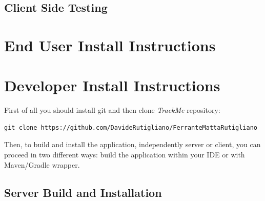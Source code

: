 \documentclass[a4paper]{article}
\begin{document}
\subsection{Client Side Testing}
\newpage
\section{End User Install Instructions}

\newpage
\section{Developer Install Instructions}
First of all you should install git and then clone \textit{TrackMe} repository:
\begin{lstlisting}
git clone https://github.com/DavideRutigliano/FerranteMattaRutigliano
\end{lstlisting}

Then, to build and install the application, independently server or client, you can proceed in two different ways: build the application within your IDE or with Maven/Gradle wrapper.
\subsection{Server Build and Installation}
\end{document}
